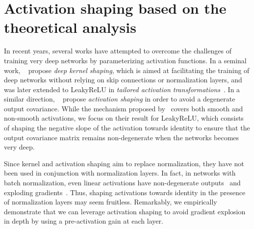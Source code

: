 \section{Activation shaping based on the theoretical analysis} 
In recent years, several works have attempted to overcome the challenges of training very deep networks by parameterizing activation functions. 
In a seminal work, ~\citet{martens2021rapid} propose \textit{deep kernel shaping}, which is aimed at facilitating the training of deep networks without relying on skip connections or normalization layers, and was later extended to LeakyReLU in \textit{tailored activation transformations}~\citep{zhang2022deep}. In a similar direction, ~\citet{li2022neural} propose \textit{activation shaping} in order to avoid a degenerate output covariance. While the mechanism proposed by~\citet{li2022neural} covers both smooth and non-smooth activations, we focus on their result for LeakyReLU, which consists of shaping the negative slope of the activation towards identity to ensure that the output covariance matrix remains non-degenerate when the networks becomes very deep. 

Since kernel and activation shaping aim to replace normalization, they have not been used in conjunction with normalization layers. 
In fact, in networks with batch normalization, even linear activations have non-degenerate outputs~\citep{daneshmand2021batch,yang2018a} and exploding gradients~\citep{yang2018a}. Thus, shaping activations towards identity in the presence of normalization layers may seem fruitless. Remarkably, we empirically demonstrate that we can leverage activation shaping to avoid gradient explosion in depth by using a pre-activation gain at each layer. 


